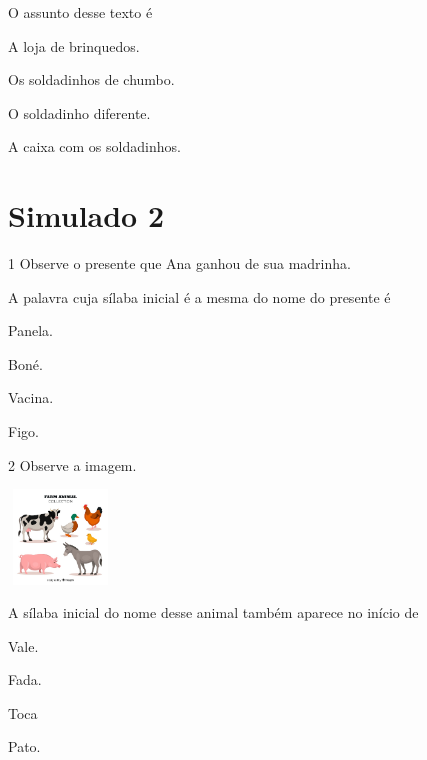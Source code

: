 O assunto desse texto é

\begin{escolha}
\item A loja de brinquedos.

\item Os soldadinhos de chumbo.

\item O soldadinho diferente.

\item A caixa com os soldadinhos.
\end{escolha}


\chapter{Simulado 2}

\num{1} Observe o presente que Ana ganhou de sua madrinha.


A palavra cuja sílaba inicial é a mesma do nome do presente é

\begin{escolha}
\item Panela.

\item Boné.

\item Vacina.

\item Figo.
\end{escolha}

\num{2} Observe a imagem.

\includegraphics[width=1.10000in,height=0.99236in]{media/image148.jpeg}


A sílaba inicial do nome desse animal também aparece no início de

\begin{escolha}
\item Vale.

\item Fada.

\item Toca

\item Pato.
\end{escolha}

